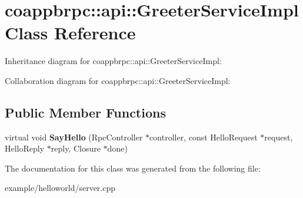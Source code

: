 \hypertarget{classcoappbrpc_1_1api_1_1GreeterServiceImpl}{}\section{coappbrpc\+:\+:api\+:\+:Greeter\+Service\+Impl Class Reference}
\label{classcoappbrpc_1_1api_1_1GreeterServiceImpl}


Inheritance diagram for coappbrpc\+:\+:api\+:\+:Greeter\+Service\+Impl\+:


Collaboration diagram for coappbrpc\+:\+:api\+:\+:Greeter\+Service\+Impl\+:
\subsection*{Public Member Functions}
\begin{DoxyCompactItemize}
\item 
\mbox{\label{classcoappbrpc_1_1api_1_1GreeterServiceImpl_a009b97643d9728170104e367b8f40167}} 
virtual void {\bfseries Say\+Hello} (Rpc\+Controller $\ast$controller, const Hello\+Request $\ast$request, Hello\+Reply $\ast$reply, Closure $\ast$done)
\end{DoxyCompactItemize}


The documentation for this class was generated from the following file\+:\begin{DoxyCompactItemize}
\item 
example/helloworld/server.\+cpp\end{DoxyCompactItemize}
